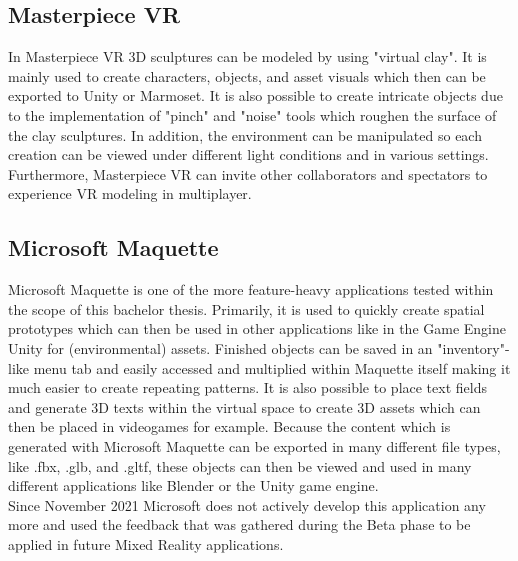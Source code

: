 \documentclass{report}
\begin{document}
		\subsection[Masterpiece VR]{Masterpiece VR \textsc{\small{\cite{MVR}}}}
		\startsubsection
			In Masterpiece VR 3D  sculptures can be modeled by using "virtual clay". It is mainly used to create characters, objects, and asset visuals which then can be exported to Unity or Marmoset. It is also possible to create intricate objects due to the implementation of "pinch" and "noise" tools which roughen the surface of the clay sculptures. In addition, the environment can be manipulated so each creation can be viewed under different light conditions and in various settings. \\
			Furthermore, Masterpiece VR can invite other collaborators and spectators to experience VR modeling in multiplayer.
		\closesection
		\subsection[Microsoft Maquette]{Microsoft Maquette \textsc{\small{\cite{MSM}}}}
		\startsubsection
			Microsoft Maquette is one of the more feature-heavy applications tested within the scope of this bachelor thesis. Primarily, it is used to quickly create spatial prototypes which can then be used in other applications like in the Game Engine Unity for (environmental) assets. Finished objects can be saved in an "inventory"-like menu tab and easily accessed and multiplied within Maquette itself making it much easier to create repeating patterns. It is also possible to place text fields and generate 3D texts within the virtual space to create 3D assets which can then be placed in videogames for example. Because the content which is generated with Microsoft Maquette can be exported in many different file types, like .fbx, .glb, and .gltf, these objects can then be viewed and used in many different applications like Blender or the Unity game engine. \\
			Since November 2021 Microsoft does not actively develop this application any more and used the feedback that was gathered during the Beta phase to be applied in future Mixed Reality applications.
		\closesection
	\closesection
			
\end{document}
